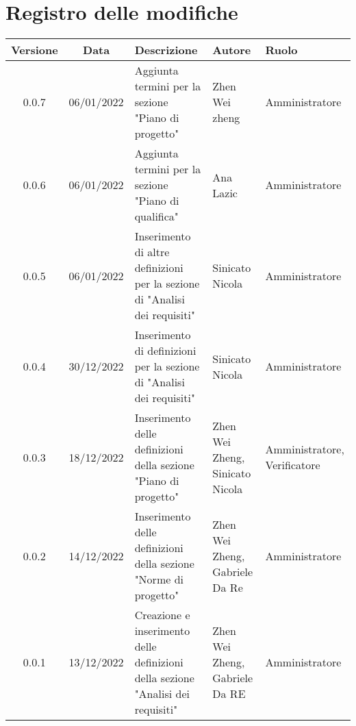 \section*{Registro delle modifiche}
\begin{center}
\renewcommand\tabularxcolumn[1]{>{\Centering}m{#1}}
\begin{tabularx}{\textwidth}{| c | c | X | X | X |} 
\hline
 \textbf{Versione} & \textbf{Data} & \textbf{Descrizione} & \textbf{Autore} & \textbf{Ruolo}\\
 \hline
 0.0.7 & 06/01/2022 & Aggiunta termini per la sezione "Piano di progetto" & Zhen Wei zheng & Amministratore \\
 \hline
 0.0.6 & 06/01/2022 & Aggiunta termini per la sezione "Piano di qualifica" & Ana Lazic & Amministratore \\
 \hline
 0.0.5 & 06/01/2022 & Inserimento di altre definizioni per la sezione di "Analisi dei requisiti" & Sinicato Nicola & Amministratore \\
 \hline
 0.0.4 & 30/12/2022 & Inserimento di definizioni per la sezione di "Analisi dei requisiti" & Sinicato Nicola & Amministratore \\
 \hline
 0.0.3 & 18/12/2022 & Inserimento delle definizioni della sezione "Piano di progetto" & Zhen Wei Zheng, Sinicato Nicola & Amministratore, Verificatore\\
 \hline
 0.0.2 & 14/12/2022 & Inserimento delle definizioni della sezione "Norme di progetto" & Zhen Wei Zheng, Gabriele Da Re & Amministratore\\
 \hline
 0.0.1 & 13/12/2022 & Creazione e inserimento delle definizioni della sezione "Analisi dei requisiti" & Zhen Wei Zheng, Gabriele Da RE & Amministratore\\
 \hline
\end{tabularx}
\end{center}
